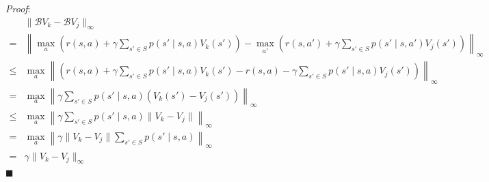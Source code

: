 \documentclass[10pt, a4paper]{report}
\begin{document}
\noindent\textit{Proof}:\begin{align}
&\|\mathcal{B}V_k - \mathcal{B}V_j\|_\infty\\ =& \left\| \max_{a} \left(r(s,a) + \gamma \sum_{s'\in S} p(s' \mid s, a)V_k(s')\right) - \max_{a'} \left(r(s,a') + \gamma \sum_{s'\in S} p(s' \mid s, a')V_j(s')\right) \right\|_\infty \\[10pt]
\le& \max_{a} \left\| \left(r(s,a) + \gamma \sum_{s'\in S} p(s' \mid s, a)V_k(s') - r(s,a) - \gamma \sum_{s'\in S} p(s' \mid s, a)V_j(s')\right) \right\|_\infty \\[10pt]
=& \max_{a} \left\| \gamma \sum_{s'\in S} p(s' \mid s, a)(V_k(s') - V_j(s')) \right\|_\infty \\[10pt]
\le& \max_{a} \left\| \gamma \sum_{s'\in S} p(s' \mid s, a)\|V_k - V_j\| \right\|_\infty \\[10pt]
=& \max_{a} \left\| \gamma \|V_k - V_j\| \sum_{s'\in S} p(s' \mid s, a) \right\|_\infty \\[10pt]
=& \gamma \|V_k - V_j\|_\infty
\end{align}\hfill$\blacksquare$
\end{document}
